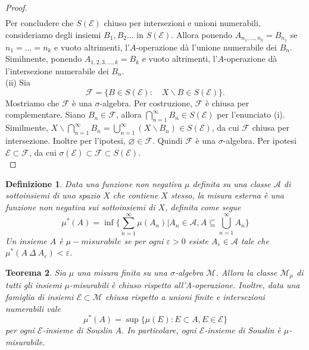 \documentclass[a4paper, twoside,openright]{article}
\newcommand{\<}{\langle}
\renewcommand{\>}{\rangle}
\newtheorem{teo}{Teorema}[]
\newtheorem{defin}[teo]{Definizione}
\begin{document}
\begin{proof}
$$\begin{aligned}
	\end{aligned}
	$$
	Per concludere che $S(\mathcal{E})$ chiuso per intersezioni e unioni numerabili, consideriamo degli insiemi $B_1, B_2...$ in $S(\mathcal{E})$. Allora ponendo $A_{n_1,...,n_k}=B_{n_1}$ se $n_1=...=n_k$ e vuoto altrimenti, l'$A$-operazione dà l'unione numerabile dei $B_n$.\\
	Similmente, ponendo $A_{1,2,3,...,k}=B_{k}$ e vuoto altrimenti,  l'$A$-operazione dà l'intersezione numerabile dei $B_n$.\\
	(ii) Sia
	$$
	\mathcal{F}=\{B \in S(\mathcal{E}): \quad X \backslash B \in S(\mathcal{E})\} .
	$$
	Mostriamo che $\mathcal{F}$ è una $\sigma$-algebra. Per costruzione, $\mathcal{F}$ è chiusa per complementare. Siano $B_{n} \in \mathcal{F}$, allora $\bigcap_{n=1}^{\infty} B_{n} \in S(\mathcal{E})$ per l'enunciato (i). Similmente, $X \backslash \bigcap_{n=1}^{\infty} B_{n}=\bigcup_{n=1}^{\infty}\left(X \backslash B_{n}\right) \in S(\mathcal{E})$, da cui $\mathcal{F}$ chiusa per intersezione. Inoltre per l'ipotesi, $\varnothing \in \mathcal{F}$. Quindi $\mathcal{F}$ è una $\sigma$-algebra. Per ipotesi $\mathcal{E} \subset \mathcal{F}$, da cui $\sigma(\mathcal{E}) \subset \mathcal{F} \subset S(\mathcal{E})$.\\
\end{proof}

\begin{defin}
	Data una funzione non negativa $\mu$ definita su una classe $\mathcal{A}$ di sottoinsiemi di uno spazio $X$ che contiene $X$ stesso, la misura esterna è una funzione non negativa sui sottoinsiemi di $X$, definita come segue
	$$ \mu^*(A) = \inf \{ \sum_{n=1}^{\infty} \mu (A_n) | A_n \in \mathcal{A}, A \subseteq \bigcup_{n=1}^{\infty} A_n \} $$
	Un insieme $A$ è $\mu-misurabile$ se per ogni $\varepsilon > 0$ esiste $A_{\varepsilon} \in \mathcal{A}$ tale che $\mu^*(A \ \Delta \ A_{\varepsilon}) < \varepsilon$.
\end{defin}	


\begin{teo}
	Sia $\mu$ una misura finita su una $\sigma$-algebra $\mathcal{M}$. Allora la classe $\mathcal{M}_{\mu}$ di tutti gli insiemi $\mu$-misurabili è chiuso rispetto all'A-operazione. Inoltre, data una famiglia di insiemi $\mathcal{E} \subset \mathcal{M}$ chiusa rispetto a unioni finite e intersezioni numerabili vale
	$$
	\mu^{*}(A)=\sup \{\mu(E): E \subset A, E \in \mathcal{E}\}
	$$
	per ogni $\mathcal{E}$-insieme di Souslin $A$. In particolare, ogni $\mathcal{E}$-insieme di Souslin è $\mu$-misurabile.
\end{teo}
\end{document}
